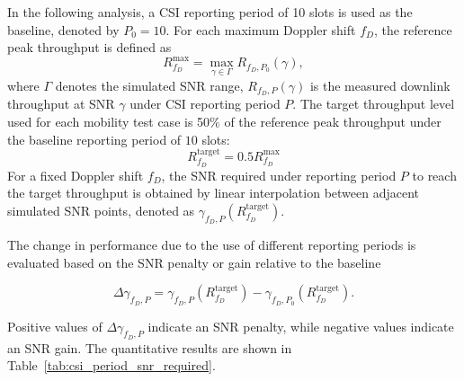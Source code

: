 \documentclass[a4paper,12pt,onecolumn]{article}
\begin{document}
			In the following analysis, a CSI reporting period of 10 slots is used as the baseline, denoted by \(P_0=10\). For each maximum Doppler shift \(f_D\), the reference peak throughput is defined as
			\begin{equation}
				R^{\max}_{f_D}
				=
				\max_{\gamma \in \Gamma} R_{f_D,P_0}(\gamma),
			\end{equation}
			where \(\Gamma\) denotes the simulated SNR range, \(R_{f_D,P}(\gamma)\) is the measured downlink throughput at SNR \(\gamma\) under CSI reporting period \(P\). The target throughput level used for each mobility test case is 50\% of the reference peak throughput under the baseline reporting period of \(10\) slots: \[
			R^{\mathrm{target}}_{f_D}
			=
			0.5R^{\max}_{f_D}
			\]
			For a fixed Doppler shift \(f_D\), the SNR required under reporting period
			\(P\) to reach the target throughput is obtained by linear interpolation between adjacent simulated SNR points, denoted as $\gamma_{f_D,P}\left(R^{\mathrm{target}}_{f_D}\right)$.
			
			The change in performance due to the use of different reporting periods is evaluated based on the SNR penalty or gain relative to the baseline
			
			\begin{equation}
				\Delta \gamma_{f_D,P}
				=
				\gamma_{f_D,P}(R^{\mathrm{target}}_{f_D})
				-
				\gamma_{f_D,P_0}(R^{\mathrm{target}}_{f_D}).
			\end{equation}
			
			Positive values of $\Delta \gamma_{f_D,P}$ indicate an SNR penalty, while negative values indicate an SNR gain. The quantitative results are shown in Table~\ref{tab:csi_period_snr_required}.
\end{document}
